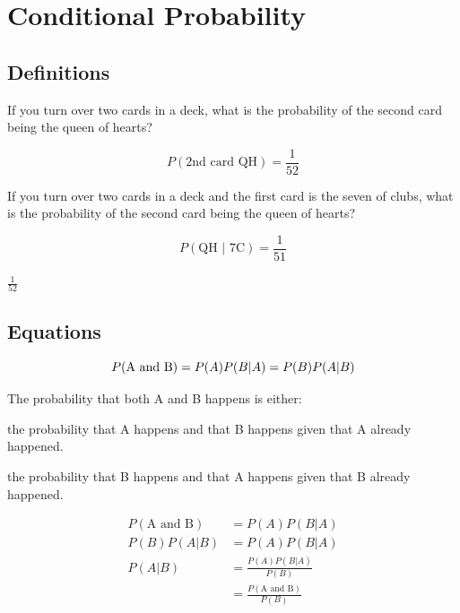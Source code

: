 \documentclass[landscape]{exam}
\begin{document}
  \section{Conditional Probability}

  \subsection{Definitions}
  If you turn over two cards in a deck, what is the probability of the second
  card being the queen of hearts?

  \begin{solution}
    \[
      P(\text{2nd card QH}) = \frac{1}{52}
    \]
  \end{solution}

  If you turn over two cards in a deck and the first card is the seven of clubs,
  what is the probability of the second card being the queen of hearts?

  \begin{solution}
    \[
      P(\text{QH } | \text{ 7C}) = \frac{1}{51}
    \]
  \end{solution}

  \begin{solution}
    $\frac{1}{52}$
  \end{solution}

  \subsection{Equations}
  \[
    P(\text{A and B}) = P(A) P(B | A) = P(B) P(A | B) \\
  \]

  The probability that both A and B happens is either:
  \begin{itemize*}
    \item the probability that A happens and that B happens given that A already
      happened.
    \item the probability that B happens and that A happens given that B already 
      happened.
  \end{itemize*}

  \begin{align*}
    P(\text{A and B}) & = P(A) P(B | A) \\
    P(B) P(A | B)     & = P(A) P(B | A) \\
    P(A | B)          & = \frac{P(A) P(B | A)}{P(B)} \\
                      & = \frac{P(\text{A and B})}{P(B)} \\
  \end{align*}
\end{document}

